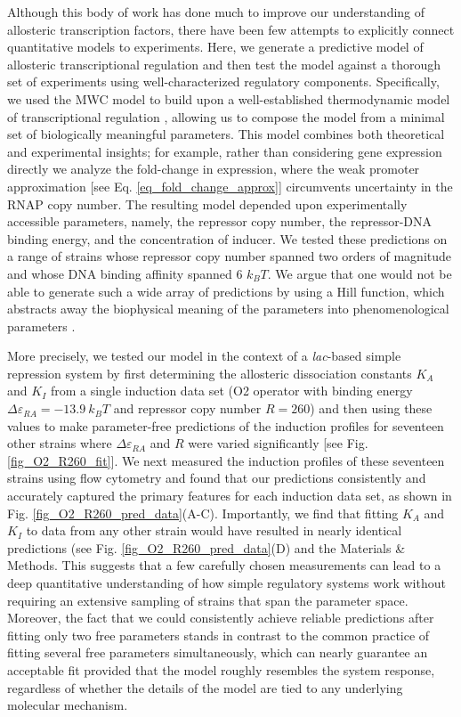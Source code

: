 Although this body of work has done much to improve our understanding of
allosteric transcription factors, there have been few attempts to explicitly
connect quantitative models to experiments. Here, we generate a predictive
model of allosteric transcriptional regulation and then test the model
against a thorough set of experiments using well-characterized regulatory
components. Specifically, we used the MWC model to build upon a
well-established thermodynamic model of transcriptional regulation
\cite{Bintu2005, Garcia2011}, allowing us to compose the model from a minimal
set of biologically meaningful parameters. This model combines both
theoretical and experimental insights; for example, rather than considering
gene expression directly we analyze the fold-change in expression, where the
weak promoter approximation [see Eq. \ref{eq_fold_change_approx}] circumvents
uncertainty in the RNAP copy number. The resulting model depended upon
experimentally accessible parameters, namely, the repressor copy number, the
repressor-DNA binding energy, and the concentration of inducer.
We tested these predictions on a range of strains whose repressor
copy number spanned two orders of magnitude and whose DNA binding affinity
spanned 6 $k_BT$. We argue that one would not be able to generate such a wide
array of predictions by using a Hill function, which abstracts away the
biophysical meaning of the parameters into phenomenological parameters
\cite{Forsen1995}.

More precisely, we tested our model in the context of a \textit{lac}-based simple repression
system by first determining the allosteric dissociation constants $K_A$ and
$K_I$ from a single induction data set (O2 operator with binding energy $\Delta
\varepsilon_{RA} = -13.9~k_BT$ and repressor copy number $R = 260$) and then
using these values to make parameter-free predictions of the induction profiles
for seventeen other strains where $\Delta \varepsilon_{RA}$ and $R$ were varied
significantly [see Fig. \ref{fig_O2_R260_fit}]. We next measured the induction
profiles of these seventeen strains using flow cytometry and found that our
predictions consistently and accurately captured the primary features for each
induction data set, as shown in
Fig. \ref{fig_O2_R260_pred_data}(A-C). Importantly, we find that
fitting $K_A$ and $K_I$ to data from any other strain would have resulted in
nearly identical predictions (see Fig. \ref{fig_O2_R260_pred_data}(D) and
the Materials \& Methods. This
suggests that a few carefully chosen measurements can lead to a deep
quantitative understanding of how simple regulatory systems work without
requiring an extensive sampling of strains that span the parameter space.
Moreover, the fact that we could consistently achieve reliable predictions after
fitting only two free parameters stands in contrast to the common practice of
fitting several free parameters simultaneously, which can nearly guarantee an
acceptable fit provided that the model roughly resembles the system response,
regardless of whether the details of the model are tied to any underlying
molecular mechanism.

